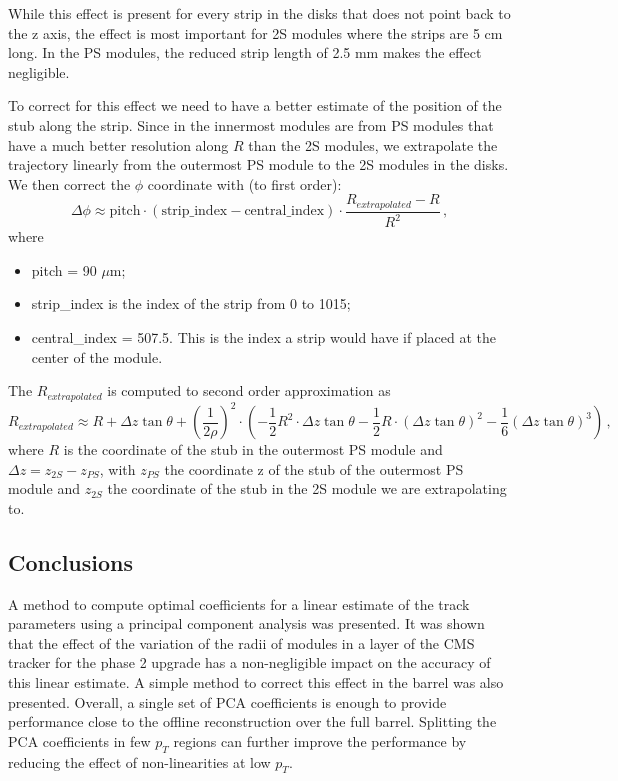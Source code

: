 \documentclass[10pt,a4paper]{report}
\begin{document}
While this effect is present for every strip in the disks that does not point back to the z axis, the effect is most important for 2S modules where the strips are 5 cm long. In the PS modules, the reduced strip length of 2.5 mm makes the effect negligible.

To correct for this effect we need to have a better estimate of the position of the stub along the strip. Since in the innermost modules are from PS modules that have a much better resolution along $R$ than the 2S modules, we extrapolate the trajectory linearly from the outermost PS module to the 2S modules in the disks. We then correct the $\phi$ coordinate with (to first order):
\begin{equation}
\Delta\phi \approx \mbox{pitch} \cdot (\mbox{strip\_index} - \mbox{central\_index}) \cdot \frac{R_{extrapolated} - R}{R^2} \, ,
\end{equation}
where
\begin{itemize}
\item pitch = 90 $\mu$m;
\item strip\_index is the index of the strip from 0 to 1015;
\item central\_index = 507.5. This is the index a strip would have if placed at the center of the module.
\end{itemize}
The $R_{extrapolated}$ is computed to second order approximation as
\begin{equation}
R_{extrapolated} \approx R + \Delta z \tan\theta + \left(\frac{1}{2\rho}\right)^2 \cdot \left(-\frac12R^2 \cdot \Delta z \tan \theta - \frac12 R \cdot (\Delta z\tan \theta)^2 - \frac16 (\Delta z \tan \theta)^3\right) \, ,
\end{equation}
where $R$ is the coordinate of the stub in the outermost PS module and $\Delta z = z_{2S} - z_{PS}$, with $z_{PS}$ the coordinate z of the stub of the outermost PS module and $z_{2S}$ the coordinate of the stub in the 2S module we are extrapolating to.

\subsection{Conclusions}

A method to compute optimal coefficients for a linear estimate of the track parameters using a principal component analysis was presented. It was shown that the effect of the variation of the radii of modules in a layer of the CMS tracker for the phase 2 upgrade has a non-negligible impact on the accuracy of this linear estimate. A simple method to correct this effect in the barrel was also presented. Overall, a single set of PCA coefficients is enough to provide performance close to the offline reconstruction over the full barrel. Splitting the PCA coefficients in few $p_T$ regions can further improve the performance by reducing the effect of non-linearities at low $p_T$.
\end{document}
